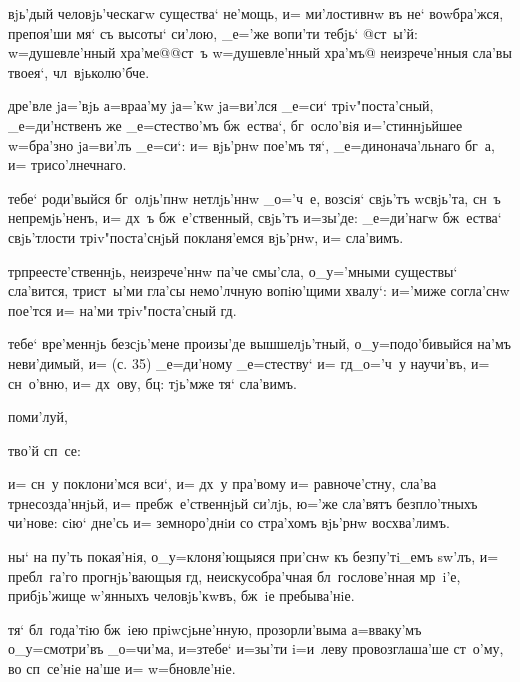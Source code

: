 
  вjь'дый человjь'ческагw существа` 
не'мощь, и= ми'лостивнw въ не` воwбра'жся, препоя'ши мя` 
съ высоты` си'лою, _е='же вопи'ти тебjь` @ст~ы'й: 
w=душевле'нный хра'ме@{@ст~ъ w=душевле'нный хра'мъ@} 
неизрече'нныя сла'вы твоея`, чл~вjьколю'бче.

 дре'вле jа='вjь а=враа'му jа='кw jа=ви'лся _е=си` 
трiv"поста'сный, _е=ди'нственъ же _е=стество'мъ 
бж~ества`, бг~осло'вiя и='стиннjьйшее w=бра'зно jа=ви'лъ 
_е=си`: и= вjь'рнw пое'мъ тя`, _е=динонача'льнаго бг~а, 
и= трисо'лнечнаго.

 тебе` роди'выйся бг~олjь'пнw нетлjь'ннw 
_о='ч~е, возсiя` свjь'тъ w\т свjь'та, сн~ъ непремjь'ненъ, 
и= дх~ъ бж~е'ственный, свjь'тъ и=зы'де: _е=ди'нагw 
бж~ества` свjь'тлости трiv"поста'снjьй покланя'емся 
вjь'рнw, и= сла'вимъ.

  тр преесте'ственнjь, 
неизрече'ннw па'че смы'сла, о_у='мными существы` 
сла'вится, трист~ы'ми гла'сы немо'лчную вопiю'щими 
хвалу`: и='миже согла'снw пое'тся и= на'ми 
трiv"поста'сный гд.

  тебе` вре'меннjь без\ъ сjь'мене 
произы'де вышшелjь'тный, о_у=подо'бивыйся на'мъ 
неви'димый, и= (с. 35) _е=ди'ному _е=стеству` и= 
гд _о='ч~у научи'въ, и= сн~о'вню, и= дх~ову, 
бц: тjь'мже тя` сла'вимъ.

 поми'луй, 

     тво'й сп~се:

 и= сн~у поклони'мся вси`, и= дх~у пра'вому и= 
равноче'стну, сла'ва тр несозда'ннjьй, и= 
пребж~е'ственнjьй си'лjь, ю='же сла'вятъ безпло'тныхъ 
чи'нове: сiю` дне'сь и= земноро'днiи со стра'хомъ вjь'рнw 
восхва'лимъ.

     ны` на 
пу'ть покая'нiя, о_у=клоня'ющыяся при'снw къ безпу'тi_емъ 
sw'лъ, и= пребл~га'го прогнjь'вающыя гд, 
неискусобра'чная бл~гослове'нная мр~i'е, прибjь'жище 
w'янныхъ человjь'кwвъ, бж~iе пребыва'нiе.


 тя` бл~года'тiю бж~iею 
прiwсjьне'нную, прозорли'выма а=вваку'мъ о_у=смотри'въ 
_о=чи'ма, и=з\ъ тебе` и=зы'ти i=и~леву провозглаша'ше 
ст~о'му, во сп~се'нiе на'ше и= w=бновле'нiе.

